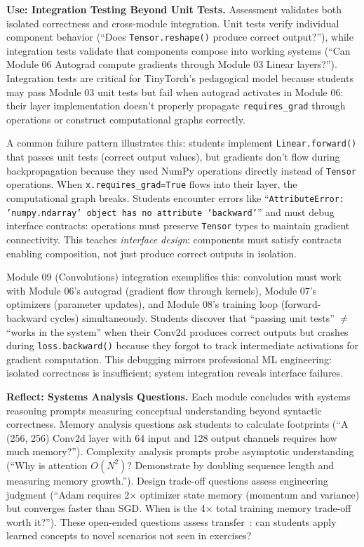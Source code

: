 \documentclass[10pt,twocolumn]{article}
\begin{document}
\textbf{Use: Integration Testing Beyond Unit Tests.} Assessment validates both isolated correctness and cross-module integration. Unit tests verify individual component behavior (``Does \texttt{Tensor.reshape()} produce correct output?''), while integration tests validate that components compose into working systems (``Can Module 06 Autograd compute gradients through Module 03 Linear layers?''). Integration tests are critical for TinyTorch's pedagogical model because students may pass Module 03 unit tests but fail when autograd activates in Module 06: their layer implementation doesn't properly propagate \texttt{requires\_grad} through operations or construct computational graphs correctly.

A common failure pattern illustrates this: students implement \texttt{Linear.forward()} that passes unit tests (correct output values), but gradients don't flow during backpropagation because they used NumPy operations directly instead of \texttt{Tensor} operations. When \texttt{x.requires\_grad=True} flows into their layer, the computational graph breaks. Students encounter errors like ``\texttt{AttributeError: 'numpy.ndarray' object has no attribute 'backward'}'' and must debug interface contracts: operations must preserve \texttt{Tensor} types to maintain gradient connectivity. This teaches \emph{interface design}: components must satisfy contracts enabling composition, not just produce correct outputs in isolation.

Module 09 (Convolutions) integration exemplifies this: convolution must work with Module 06's autograd (gradient flow through kernels), Module 07's optimizers (parameter updates), and Module 08's training loop (forward-backward cycles) simultaneously. Students discover that ``passing unit tests'' $\neq$ ``works in the system'' when their Conv2d produces correct outputs but crashes during \texttt{loss.backward()} because they forgot to track intermediate activations for gradient computation. This debugging mirrors professional ML engineering: isolated correctness is insufficient; system integration reveals interface failures.

\textbf{Reflect: Systems Analysis Questions.}
Each module concludes with systems reasoning prompts measuring conceptual understanding beyond syntactic correctness. Memory analysis questions ask students to calculate footprints (``A (256, 256) Conv2d layer with 64 input and 128 output channels requires how much memory?''). Complexity analysis prompts probe asymptotic understanding (``Why is attention $O(N^2)$? Demonstrate by doubling sequence length and measuring memory growth.''). Design trade-off questions assess engineering judgment (``Adam requires 2$\times$ optimizer state memory (momentum and variance) but converges faster than SGD. When is the 4$\times$ total training memory trade-off worth it?''). These open-ended questions assess transfer~\citep{perkins1992transfer}: can students apply learned concepts to novel scenarios not seen in exercises?
\end{document}
